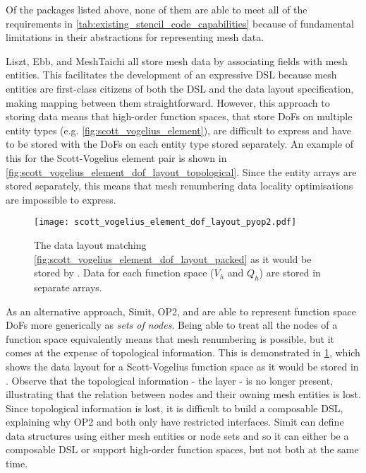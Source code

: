 \documentclass[thesis]{subfiles}
\begin{document}
Of the packages listed above, none of them are able to meet all of the requirements in \cref{tab:existing_stencil_code_capabilities} because of fundamental limitations in their abstractions for representing mesh data.

Liszt, Ebb, and MeshTaichi all store mesh data by associating fields with mesh entities.
This facilitates the development of an expressive DSL because mesh entities are first-class citizens of both the DSL and the data layout specification, making mapping between them straightforward.
However, this approach to storing data means that high-order function spaces, that store DoFs on multiple entity types (e.g. \cref{fig:scott_vogelius_element}), are difficult to express and have to be stored with the DoFs on each entity type stored separately.
An example of this for the Scott-Vogelius element pair is shown in \cref{fig:scott_vogelius_element_dof_layout_topological}.
Since the entity arrays are stored separately, this means that mesh renumbering data locality optimisations are impossible to express.

\begin{figure}
  \centering
  \texttt{[image: scott\_vogelius\_element\_dof\_layout\_pyop2.pdf]}
  \caption{
    The data layout matching \cref{fig:scott_vogelius_element_dof_layout_packed} as it would be stored by .
    Data for each function space ($V_h$ and $Q_h$) are stored in separate arrays.
  }
  \label{fig:scott_vogelius_element_dof_layout_pyop2}
\end{figure}

As an alternative approach, Simit, OP2, and  are able to represent function space DoFs more generically as \emph{sets of nodes}.
Being able to treat all the nodes of a function space equivalently means that mesh renumbering is possible, but it comes at the expense of topological information.
This is demonstrated in \cref{fig:scott_vogelius_element_dof_layout_pyop2}, which shows the data layout for a Scott-Vogelius function space as it would be stored in .
Observe that the topological information - the  layer - is no longer present, illustrating that the relation between nodes and their owning mesh entities is lost.
Since topological information is lost, it is difficult to build a composable DSL, explaining why OP2 and  both only have restricted interfaces.
Simit can define data structures using either mesh entities or node sets and so it can either be a composable DSL or support high-order function spaces, but not both at the same time.
\end{document}
